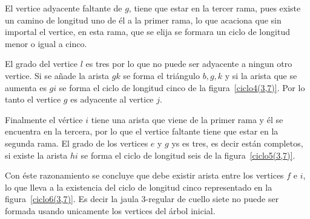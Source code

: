 \documentclass[12pt]{book}
\theoremstyle{definition}
\begin{document}
El vertice adyacente faltante de $g$, tiene que estar en la tercer
rama, pues existe un camino de longitud uno de él a la primer rama, lo
que acaciona que sin importal el vertice, en esta rama, que se elija
se formara un ciclo de longitud menor o igual a cinco.

El grado del vertice $l$ es tres por lo que no puede ser adyacente a
ningun otro vertice. Si se añade la arista $gk$ se forma el triángulo
$b,g,k$ y si la arista que se aumenta es $gi$ se forma el ciclo de
longitud cinco de la
figura~\ref{ciclo4(3,7)}. Por lo tanto el vertice $g$ es adyacente al
vertice $j$.


Finalmente el vértice $i$ tiene una arista que viene de la primer rama
y él se encuentra en la tercera, por lo que el vertice faltante tiene
que estar en la segunda
rama. El grado de los vertices $e$ y $g$ ys es tres, es decir están
completos, si existe la arista $hi$ se forma el ciclo de
longitud seis de la figura~\ref{ciclo5(3,7)}.


Con éste razonamiento se concluye que debe existir arista entre los
vertices $f$ e $i$, lo que lleva a la existencia del ciclo de longitud cinco
representado en la figura~\ref{ciclo6(3,7)}. Es decir la jaula
$3$-regular de cuello siete no
puede ser formada usando unicamente los vertices del árbol inicial.



\begin{figure}
  \centering
  \caption{} \label{ciclo1(3,7)}
\end{figure}
\end{document}
